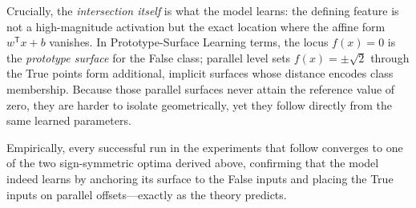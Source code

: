 Crucially, the \emph{intersection itself} is what the model learns:  
the defining feature is not a high-magnitude activation but the exact location
where the affine form \(w^{\mathsf T}x+b\) vanishes.
In Prototype-Surface Learning terms, the locus \(f(x)=0\) is the
\emph{prototype surface} for the False class; parallel level sets
\(f(x)=\pm\sqrt2\) through the True points form additional, implicit
surfaces whose distance encodes class membership.
Because those parallel surfaces never attain the reference value of zero,
they are harder to isolate geometrically, yet they follow directly from the
same learned parameters.

Empirically, every successful run in the experiments that follow converges to
one of the two sign-symmetric optima derived above, confirming that the model
indeed learns by anchoring its surface to the False inputs and placing the
True inputs on parallel offsets—exactly as the theory predicts.
